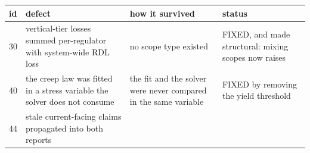 \documentclass[10pt,]{article}
\begin{document}
\begin{longtable}[]{@{}llll@{}}
\toprule
\begin{minipage}[b]{0.22\columnwidth}\raggedright
id\strut
\end{minipage} & \begin{minipage}[b]{0.22\columnwidth}\raggedright
defect\strut
\end{minipage} & \begin{minipage}[b]{0.22\columnwidth}\raggedright
how it survived\strut
\end{minipage} & \begin{minipage}[b]{0.22\columnwidth}\raggedright
status\strut
\end{minipage}\tabularnewline
\midrule
\endhead
\begin{minipage}[t]{0.22\columnwidth}\raggedright
30\strut
\end{minipage} & \begin{minipage}[t]{0.22\columnwidth}\raggedright
vertical-tier losses summed per-regulator with system-wide RDL
loss\strut
\end{minipage} & \begin{minipage}[t]{0.22\columnwidth}\raggedright
no scope type existed\strut
\end{minipage} & \begin{minipage}[t]{0.22\columnwidth}\raggedright
FIXED, and made structural: mixing scopes now raises\strut
\end{minipage}\tabularnewline
\begin{minipage}[t]{0.22\columnwidth}\raggedright
40\strut
\end{minipage} & \begin{minipage}[t]{0.22\columnwidth}\raggedright
the creep law was fitted in a stress variable the solver does not
consume\strut
\end{minipage} & \begin{minipage}[t]{0.22\columnwidth}\raggedright
the fit and the solver were never compared in the same variable\strut
\end{minipage} & \begin{minipage}[t]{0.22\columnwidth}\raggedright
FIXED by removing the yield threshold\strut
\end{minipage}\tabularnewline
\begin{minipage}[t]{0.22\columnwidth}\raggedright
44\strut
\end{minipage} & \begin{minipage}[t]{0.22\columnwidth}\raggedright
stale current-facing claims propagated into both reports\strut

\end{minipage}
\end{longtable}
\end{document}
